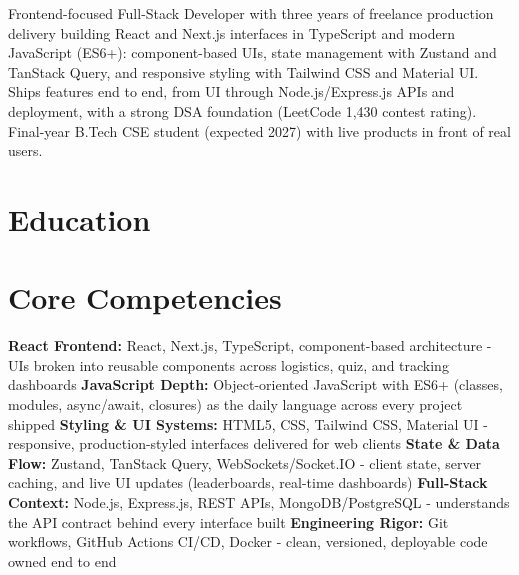 \documentclass[11pt,a4paper,sans]{moderncv}
\begin{document}
\makecvtitle


\vspace{4pt}
\small{Frontend-focused Full-Stack Developer with three years of freelance production delivery building React and Next.js interfaces in TypeScript and modern JavaScript (ES6+): component-based UIs, state management with Zustand and TanStack Query, and responsive styling with Tailwind CSS and Material UI. Ships features end to end, from UI through Node.js/Express.js APIs and deployment, with a strong DSA foundation (LeetCode 1,430 contest rating). Final-year B.Tech CSE student (expected 2027) with live products in front of real users.}


\section{Education}
\vspace{1pt}


\section{Core Competencies}
\vspace{1pt}
\raggedright
\textbf{React Frontend:} React, Next.js, TypeScript, component-based architecture - UIs broken into reusable components across logistics, quiz, and tracking dashboards \textbar{}
\textbf{JavaScript Depth:} Object-oriented JavaScript with ES6+ (classes, modules, async/await, closures) as the daily language across every project shipped \textbar{}
\textbf{Styling \& UI Systems:} HTML5, CSS, Tailwind CSS, Material UI - responsive, production-styled interfaces delivered for web clients \textbar{}
\textbf{State \& Data Flow:} Zustand, TanStack Query, WebSockets/Socket.IO - client state, server caching, and live UI updates (leaderboards, real-time dashboards) \textbar{}
\textbf{Full-Stack Context:} Node.js, Express.js, REST APIs, MongoDB/PostgreSQL - understands the API contract behind every interface built \textbar{}
\textbf{Engineering Rigor:} Git workflows, GitHub Actions CI/CD, Docker - clean, versioned, deployable code owned end to end
\par\normalfont
\end{document}
